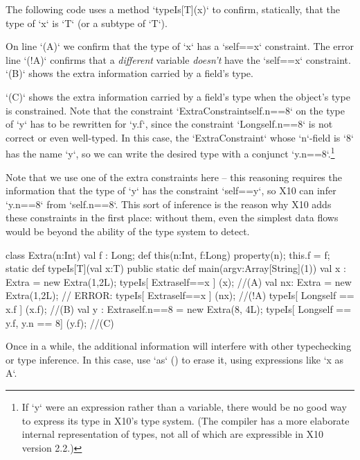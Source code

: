 \begin{ex}

The following code uses a method \xcd`typeIs[T](x)` to confirm, statically,
that the type of \xcd`x` is \xcd`T` (or a subtype of \xcd`T`).  

On line \xcd`(A)` we confirm that the type of \xcd`x` has 
a \xcd`self==x` constraint.  The error line \xcd`(!A)` confirms
that a {\em different} variable {\em doesn't} have the \xcd`self==x`
constraint. \xcd`(B)` shows the extra information carried by a field's type.

\xcd`(C)` shows the extra information carried by a field's type when the
object's type is constrained. Note that the constraint
\xcd`ExtraConstraint{self.n==8}` on the type of \xcd`y` has to be rewritten
for \xcd`y.f`, since the constraint \xcd`Long{self.n==8}` is not correct or
even well-typed. In this case, the \xcd`ExtraConstraint` whose \xcd`n`-field
is \xcd`8` has the name \xcd`y`, so we can write the desired type with a
conjunct \xcd`y.n==8`.\footnote{If \xcd`y` were an expression rather than a
variable, there would be no good way to express its type in X10's type system. 
(The compiler has a more elaborate internal representation of types, not all
of which are expressible in X10 version 2.2.)}

Note that we use one of the extra constraints here -- this reasoning requires
the information that the type of \xcd`y` has the constraint \xcd`self==y`, so
X10 can infer \xcd`y.n==8` from \xcd`self.n==8`. This sort of inference is the
reason why X10 adds these constraints in the first place: without them, even
the simplest data flows would be beyond the ability of the type system to detect.

\begin{xten}
class Extra(n:Int) {
  val f : Long;
  def this(n:Int, f:Long) { property(n); this.f = f; }
  static def typeIs[T](val x:T) {}
  public static def main(argv:Array[String](1)) {
     val x : Extra = new Extra(1,2L);
     typeIs[ Extra{self==x} ]   (x);    //(A)
     val nx: Extra = new Extra(1,2L);
     // ERROR: typeIs[ Extra{self==x} ]   (nx); //(!A)
     typeIs[ Long{self == x.f} ]          (x.f);  //(B)
     val y : Extra{self.n==8} = new Extra(8, 4L);
     typeIs[ Long{self == y.f, y.n == 8}] (y.f);  //(C)
  }
}
\end{xten}
%
\end{ex}

Once in a while, the additional information will interfere with other
typechecking or type inference.  In this case, use \xcd`as`
() to erase it, using expressions like \xcd`x as A`.


